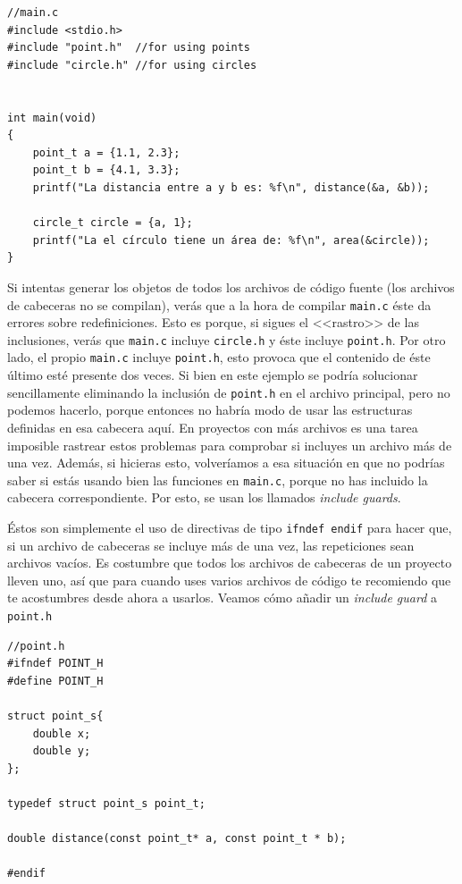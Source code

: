 \documentclass[a4paper]{article}
\begin{document}
\noindent
\begin{minipage}[H]{\linewidth}
\mbox{}
\begin{lstlisting}[style=C,
caption={Ejemplo de redefinición -- \texttt{main.c}},
label={lst:redefInclude}]
//main.c
#include <stdio.h>
#include "point.h"  //for using points
#include "circle.h" //for using circles


int main(void)
{
    point_t a = {1.1, 2.3};
    point_t b = {4.1, 3.3};
    printf("La distancia entre a y b es: %f\n", distance(&a, &b));

    circle_t circle = {a, 1};
    printf("La el círculo tiene un área de: %f\n", area(&circle));
}
\end{lstlisting}
\end{minipage}

Si intentas generar los objetos de todos los archivos de código fuente (los
archivos de cabeceras no se compilan), verás que a la hora de compilar
\verb!main.c! éste da errores sobre redefiniciones. Esto es porque, si sigues
el <<rastro>> de las inclusiones, verás que \verb!main.c! incluye
\verb!circle.h! y éste incluye \verb!point.h!. Por otro lado, el propio
\verb!main.c! incluye \verb!point.h!, esto provoca que el contenido de éste
último esté presente dos veces. Si bien en este ejemplo se podría solucionar
sencillamente eliminando la inclusión de \verb!point.h! en el archivo principal,
pero no podemos hacerlo, porque entonces no habría modo de usar las estructuras
definidas en esa cabecera aquí. En proyectos con más archivos es una tarea
imposible rastrear estos problemas
para comprobar si incluyes un archivo más de una vez. Además, si hicieras esto,
volveríamos a esa situación en que no podrías saber si estás usando bien las
funciones en \verb!main.c!, porque no has incluido la cabecera correspondiente.
Por esto, se usan los llamados \emph{include guards}.

Éstos son simplemente el uso de directivas de tipo \verb!ifndef endif! para
hacer que, si un archivo de cabeceras se incluye más de una vez, las
repeticiones sean archivos vacíos. Es costumbre que todos los archivos
de cabeceras de un proyecto lleven uno, así que para cuando uses varios
archivos de código te recomiendo que te acostumbres desde ahora a usarlos.
Veamos cómo añadir un \emph{include guard} a \verb!point.h!


\noindent
\begin{minipage}[H]{\linewidth}
\mbox{}
\begin{lstlisting}[style=C,
caption={Ejemplo de \emph{include guard}},
label={lst:includeGuard}]
//point.h
#ifndef POINT_H
#define POINT_H

struct point_s{
    double x;
    double y;
};

typedef struct point_s point_t;

double distance(const point_t* a, const point_t * b);

#endif
\end{lstlisting}
\end{minipage}
\end{document}
